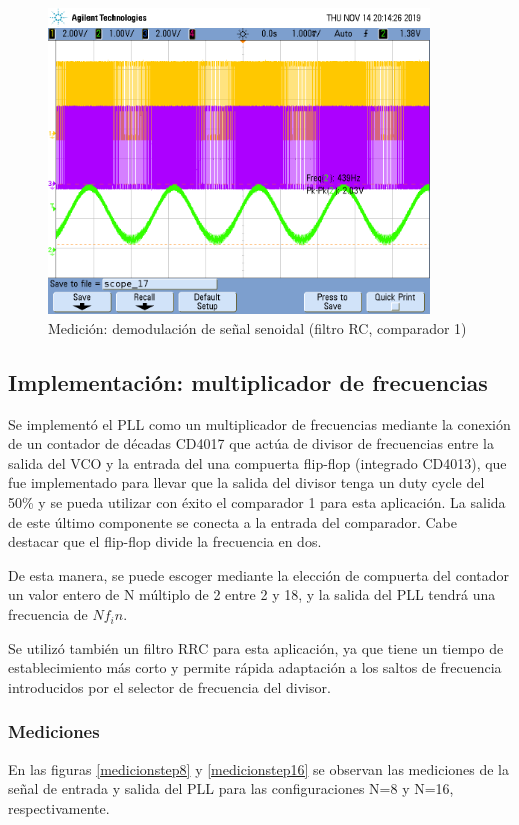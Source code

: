 \begin{figure}[H]
    \centering
    \includegraphics[width=0.9\textwidth]{../Ex2/resources/demodulacionfmsenoidalcomp1.png}
    \caption{Medición: demodulación de señal senoidal (filtro RC, comparador 1)}
    \label{modulacionfmsenoidalcomp1}
\end{figure}

\subsection{Implementación: multiplicador de frecuencias}
Se implementó el PLL como un multiplicador de frecuencias mediante la conexión de un contador de décadas CD4017 que actúa de divisor de frecuencias entre la salida del VCO y la entrada del una compuerta flip-flop (integrado CD4013), que fue implementado para llevar que la salida del divisor tenga un duty cycle del 50\% y se pueda utilizar con éxito el comparador 1 para esta aplicación. La salida de este último componente se conecta a la entrada del comparador. Cabe destacar que el flip-flop divide la frecuencia en dos.

De esta manera, se puede escoger mediante la elección de compuerta del contador un valor entero de N múltiplo de 2 entre 2 y 18, y la salida del PLL tendrá una frecuencia de $Nf_in$.


Se utilizó también un filtro RRC para esta aplicación, ya que tiene un tiempo de establecimiento más corto y permite rápida adaptación a los saltos de frecuencia introducidos por el selector de frecuencia del divisor.

\subsubsection{Mediciones}
En las figuras \ref{medicionstep8} y \ref{medicionstep16} se observan las mediciones de la señal de entrada y salida del PLL para las configuraciones N=8 y N=16, respectivamente.

